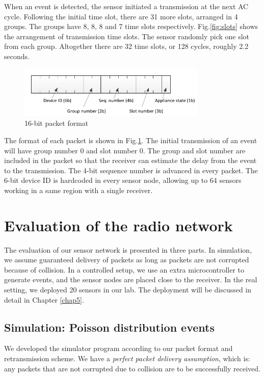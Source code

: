 When an event is detected, the sensor initiated a transmission at the next AC cycle. Following the initial time slot, there are 31 more slots, arranged in 4 groups. The groups have 8, 8, 8 and 7 time slots respectively. Fig.\ref{fig:slots} shows the arrangement of transmission time slots. The sensor randomly pick one slot from each group. Altogether there are 32 time slots, or 128 cycles, roughly 2.2 seconds. 

\begin{figure}[htb]
  \centering
  \includegraphics[width=0.8\textwidth]{figures/packet}
  \caption{16-bit packet format}
  \label{fig:packet}
\end{figure}

The format of each packet is shown in Fig.\ref{fig:packet}. The initial transmission of an event will have group number 0 and slot number 0. The group and slot number are included in the packet so that the receiver can estimate the delay from the event to the transmission. The 4-bit sequence number is advanced in every packet. The 6-bit device ID is hardcoded in every sensor node, allowing up to 64 sensors working in a same region with a single receiver. 

\section{Evaluation of the radio network}

The evaluation of our sensor network is presented in three parts. In simulation, we assume guaranteed delivery of packets as long as packets are not corrupted because of collision. In a controlled setup, we use an extra microcontroller to generate events, and the sensor nodes are placed close to the receiver. In the real setting, we deployed 20 sensors in our lab. The deployment will be discussed in detail in Chapter \ref{chap5}.

\subsection{Simulation: Poisson distribution events}

We developed the simulator program according to our packet format and retransmission scheme. We have a \textit{perfect packet delivery assumption}, which is: any packets that are not corrupted due to collision are to be successfully received. 

